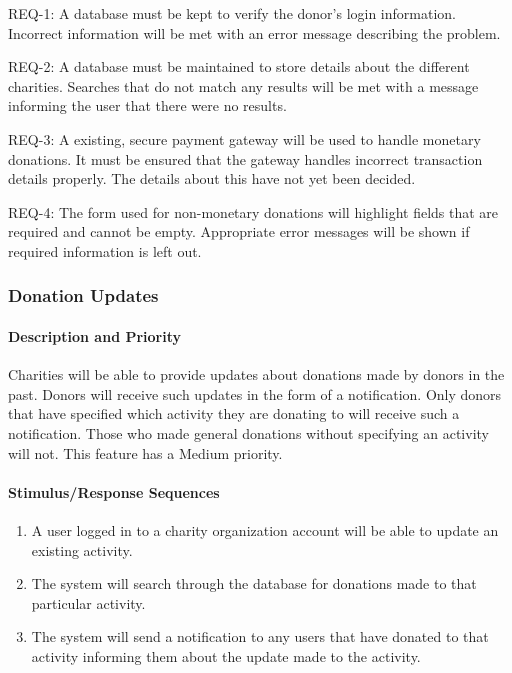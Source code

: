 \documentclass{scrreprt}
\begin{document}
                REQ-1:	A database must be kept to verify the donor’s login information. Incorrect information will be met with an error message describing the problem.\par
            
                REQ-2:	A database must be maintained to store details about the different charities. Searches that do not match any results will be met with a message informing the user that there were no results.\par
            
                REQ-3:	A existing, secure payment gateway will be used to handle monetary donations. It must be ensured that the gateway handles incorrect transaction details properly. The details about this have not yet been decided.\par
            
                REQ-4:	The form used for non-monetary donations will highlight fields that are required and cannot be empty. Appropriate error messages will be shown if required information is left out.
        
            \subsubsection{Donation Updates}

            \paragraph{Description and Priority}\mbox{}\par
                
                Charities will be able to provide updates about donations made by donors in the past. Donors will receive such updates in the form of a notification. Only donors that have specified which activity they are donating to will receive such a notification. Those who made general donations without specifying an activity will not. This feature has a Medium priority.
            
            \paragraph{Stimulus/Response Sequences}\mbox{}\par
                
                \begin{enumerate}[label=(\alph*)]
                    \item A user logged in to a charity organization account will be able to update an existing activity.
                    \item The system will search through the database for donations made to that particular activity.
                    \item The system will send a notification to any users that have donated to that activity informing them about the update made to the activity.
                \end{enumerate}
            
\end{document}
